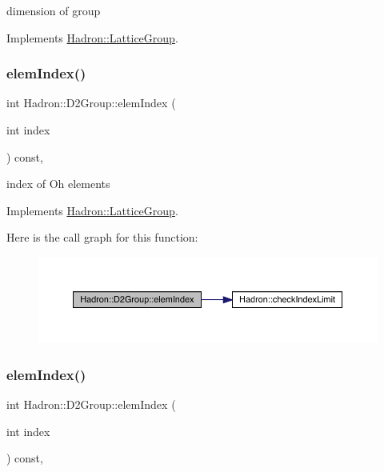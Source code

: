 dimension of group 

Implements \mbox{\hyperlink{structHadron_1_1LatticeGroup_abd8415698323796ef6a8605796ee3bea}{Hadron\+::\+Lattice\+Group}}.

\mbox{\label{structHadron_1_1D2Group_aa7676a51e002eb654648c4d84585d6da}} 
\subsubsection{\texorpdfstring{elemIndex()}{elemIndex()}\hspace{0.1cm}{\footnotesize\ttfamily [1/3]}}
{\footnotesize\ttfamily int Hadron\+::\+D2\+Group\+::elem\+Index (\begin{DoxyParamCaption}\item[{int}]{index }\end{DoxyParamCaption}) const\hspace{0.3cm}{\ttfamily [inline]}, {\ttfamily [virtual]}}

index of Oh elements 

Implements \mbox{\hyperlink{structHadron_1_1LatticeGroup_afb8e3ee60de059f75bce1044c694e1e8}{Hadron\+::\+Lattice\+Group}}.

Here is the call graph for this function\+:
\nopagebreak
\begin{figure}[H]
\begin{center}
\leavevmode
\includegraphics[width=350pt]{d8/de7/structHadron_1_1D2Group_aa7676a51e002eb654648c4d84585d6da_cgraph}
\end{center}
\end{figure}
\mbox{\label{structHadron_1_1D2Group_aa7676a51e002eb654648c4d84585d6da}} 
\subsubsection{\texorpdfstring{elemIndex()}{elemIndex()}\hspace{0.1cm}{\footnotesize\ttfamily [2/3]}}
{\footnotesize\ttfamily int Hadron\+::\+D2\+Group\+::elem\+Index (\begin{DoxyParamCaption}\item[{int}]{index }\end{DoxyParamCaption}) const\hspace{0.3cm}{\ttfamily [inline]}, {\ttfamily [virtual]}}

